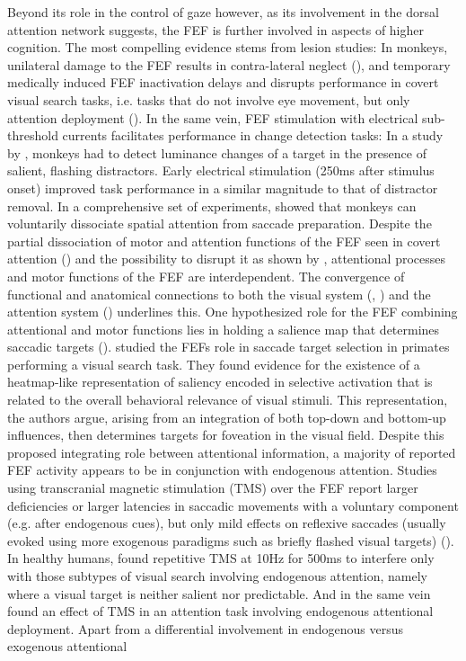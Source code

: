 \documentclass[a4paper, 12pt]{scrreprt}
\begin{document}
Beyond its role in the control of gaze however, as its involvement in the dorsal attention network suggests, the FEF is further involved in aspects of higher cognition. The most compelling evidence stems from lesion studies: In monkeys, unilateral damage to the FEF results in contra-lateral neglect (\cite{crowne1981effects}), and temporary medically induced FEF inactivation delays and disrupts performance in covert visual search tasks, i.e. tasks that do not involve eye movement, but only attention deployment (\cite{monosov2009frontal}). In the same vein, FEF stimulation with electrical sub-threshold currents facilitates performance in change detection tasks: In a study by \textcite{moore2004microstimulation}, monkeys had to detect luminance changes of a target in the presence of salient, flashing distractors. Early electrical stimulation (250ms after stimulus onset) improved task performance in a similar magnitude to that of distractor removal. In a comprehensive set of experiments, \textcite{schafer2011selective} showed that monkeys can voluntarily dissociate spatial attention from saccade preparation. \newline Despite the partial dissociation of motor and attention functions of the FEF seen in covert attention (\cite{vossel2014dorsal}) and the possibility to disrupt it as shown by \textcite{monosov2009frontal}, attentional processes and motor functions of the FEF are interdependent. The convergence of functional and anatomical connections to both the visual system (\cite{stanton1995topography}, \cite{schall1995topography}) and the attention system (\cite{corbetta2002control}) underlines this. One hypothesized role for the FEF combining attentional and motor functions lies in holding a salience map that determines saccadic targets (\cite{itti2001computational}). \textcite{thompson2005visual} studied the FEFs role in saccade target selection in primates performing a visual search task. They found evidence for the existence of a heatmap-like representation of saliency encoded in selective activation that is related to the overall behavioral relevance of visual stimuli. This representation, the authors argue, arising from an integration of both top-down and bottom-up influences, then determines targets for foveation in the visual field. Despite this proposed integrating role between attentional information, a majority of reported FEF activity appears to be in conjunction with endogenous attention. Studies using transcranial magnetic stimulation (TMS) over the FEF report larger deficiencies or larger latencies in saccadic movements with a voluntary component (e.g. after endogenous cues), but only mild effects on reflexive saccades (usually evoked using more exogenous paradigms such as briefly flashed visual targets) (\cite{vernet2014corrigendum}). In healthy humans, \textcite{muggleton2003human} found repetitive TMS at 10Hz for 500ms to interfere only with those subtypes of visual search involving endogenous attention, namely where a visual target is neither salient nor predictable. And \textcite{grosbras2002transcranial} in the same vein found an effect of TMS in an attention task involving endogenous attentional deployment.  Apart from a differential involvement in endogenous versus exogenous attentional 
\end{document}
